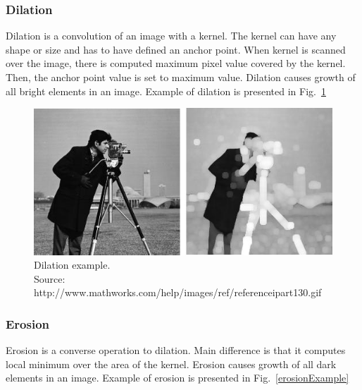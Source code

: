 \documentclass[a4paper,onecolumn,oneside,12pt]{memoir}
\begin{document}
\subsubsection{Dilation}

Dilation is a convolution of an image with a kernel. The kernel can have any shape or size and has
to have defined an anchor point. When kernel is scanned over the image, there is computed maximum
pixel value covered by the kernel. Then, the anchor point value is set to maximum value. Dilation
causes growth of all bright elements in an image. Example of dilation is presented in 
Fig.~\ref{dilationExample}

\begin{figure}[ht]
\begin{center}
\includegraphics[scale=0.6]{images/dilationExample.jpg}
\caption{Dilation example. \\
Source: http://www.mathworks.com/help/images/ref/referenceipart130.gif}
\label{dilationExample}
\end{center}
\end{figure}

\subsubsection{Erosion}

Erosion is a converse operation to dilation. Main difference is that it computes local minimum over
the area of the kernel. Erosion causes growth of all dark elements in an image. Example of erosion
is presented in Fig.~\ref{erosionExample}
\end{document}
